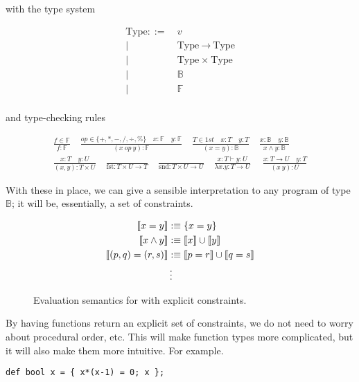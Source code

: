 \documentclass[
    9pt,            
    techreport,       
    affiltop,       
]{art}
\begin{document}
with the type system

\begin{align*}
    \text{Type} ::=&\ v \\
    |\ &\ \text{Type} \ \xrightarrow{} \ \text{Type} \\
    |\ &\ \text{Type} \ \times \ \text{Type} \\
    |\ &\ \mathbb{B} \\
    |\ &\ \mathbb{F} \\
\end{align*}

and type-checking rules

\begin{align*}
    \frac{f \in \mathbb{F}}{f : \mathbb{F}} \quad
    \frac{op \in \{+, *, -, /, \div, \% \} \quad x : \mathbb{F} \quad y : \mathbb{F} }{(x\ op\ y) : \mathbb{F}} \quad
    \frac{T \in 1st \quad x : T \quad y : T}{(x = y) : \mathbb{B}} \quad
    \frac{x : \mathbb{B} \quad y : \mathbb{B} }{x \wedge y : \mathbb{B}}\\
    \frac{x : T \quad y : U}{(x,y) : T \times U} \quad
    \frac{}{\text{fst} : T \times U \rightarrow T} \quad
    \frac{}{\text{snd} : T \times U \rightarrow U}\quad
    \frac{x : T \vdash y : U}{\lambda x.y : T \rightarrow U} \quad\
    \frac{x : T \rightarrow U \quad y : T}{(x\ y) : U} 
\end{align*}

With these in place, we can give a sensible interpretation to any program of type $\mathbb{B}$; it will be, essentially, a set of constraints.

\begin{figure}[H]
\begin{align*}
    \llbracket x = y \rrbracket &:\equiv \{x = y\}\\
    \llbracket x \wedge y \rrbracket &:\equiv \llbracket x\rrbracket \cup \llbracket y\rrbracket\\
    \llbracket (p, q) = (r, s) \rrbracket &:\equiv \llbracket p = r \rrbracket \cup \llbracket q = s \rrbracket\\
    &\,\vdots
\end{align*}
\caption{Evaluation semantics for \VampIR{} with explicit constraints.}
\label{fig:evaluation-semantics}
\end{figure}

By having functions return an explicit set of constraints, we do not need to worry about procedural order, etc. This will make function types more complicated, but it will also make them more intuitive. For example.

\begin{verbatim}
def bool x = { x*(x-1) = 0; x };
\end{verbatim}
\end{document}
